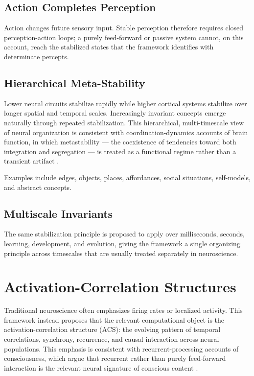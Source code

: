 \documentclass[11pt]{article}
\begin{document}
\subsection{Action Completes Perception}

Action changes future sensory input. Stable perception therefore requires closed perception-action loops; a purely feed-forward or passive system cannot, on this account, reach the stabilized states that the framework identifies with determinate percepts.

\subsection{Hierarchical Meta-Stability}

Lower neural circuits stabilize rapidly while higher cortical systems stabilize over longer spatial and temporal scales. Increasingly invariant concepts emerge naturally through repeated stabilization. This hierarchical, multi-timescale view of neural organization is consistent with coordination-dynamics accounts of brain function, in which metastability --- the coexistence of tendencies toward both integration and segregation --- is treated as a functional regime rather than a transient artifact \citep*{kelso1995,rabinovich2008}.

Examples include edges, objects, places, affordances, social situations, self-models, and abstract concepts.

\subsection{Multiscale Invariants}

The same stabilization principle is proposed to apply over milliseconds, seconds, learning, development, and evolution, giving the framework a single organizing principle across timescales that are usually treated separately in neuroscience.

\section{Activation-Correlation Structures}

Traditional neuroscience often emphasizes firing rates or localized activity. This framework instead proposes that the relevant computational object is the activation-correlation structure (ACS): the evolving pattern of temporal correlations, synchrony, recurrence, and causal interaction across neural populations. This emphasis is consistent with recurrent-processing accounts of consciousness, which argue that recurrent rather than purely feed-forward interaction is the relevant neural signature of conscious content \citep*{lamme2006}.
\end{document}
